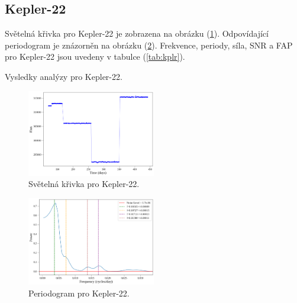 \documentclass[a4paper,11pt,twocolumn]{article}
\begin{document}
        \subsection{Kepler-22}
            Světelná křivka pro Kepler-22 je zobrazena na obrázku (\ref{fig:kplr_ls}). Odpovídající periodogram je znázorněn na obrázku (\ref{fig:kplr_per}). Frekvence, periody, síla, SNR a FAP pro Kepler-22 jsou uvedeny v tabulce (\ref{tab:kplr}).

            \begin{table}[htbp]
                \centering
                \caption{Vysledky analýzy pro Kepler-22.}
                \label{tab:kplr}
            \end{table}

            \begin{figure}
                \centering
                \includegraphics[width=0.5\textwidth]{kplr_ls.png}
                \caption{Světelná křivka pro Kepler-22.}
                \label{fig:kplr_ls}
            \end{figure}

            \begin{figure}
                \centering
                \includegraphics[width=0.5\textwidth]{kplr_per.png}
                \caption{Periodogram pro Kepler-22.}
                \label{fig:kplr_per}
            \end{figure}
    
\end{document}
